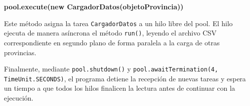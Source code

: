 \documentclass[11pt,a4paper]{article}
\begin{document}
\textbf{pool.execute(new CargadorDatos(objetoProvincia))}

Este método asigna la tarea \texttt{CargadorDatos} a un hilo libre del pool. El
hilo ejecuta de manera asíncrona el método \texttt{run()}, leyendo el archivo
CSV correspondiente en segundo plano de forma paralela a la carga de otras
provincias.

Finalmente, mediante \texttt{pool.shutdown()} y \texttt{pool.awaitTermination(4,
TimeUnit.SECONDS)}, el programa detiene la recepción de nuevas tareas y espera
un tiempo a que todos los hilos finalicen la lectura antes de continuar con la
ejecución.

%
%
%
\end{document}
